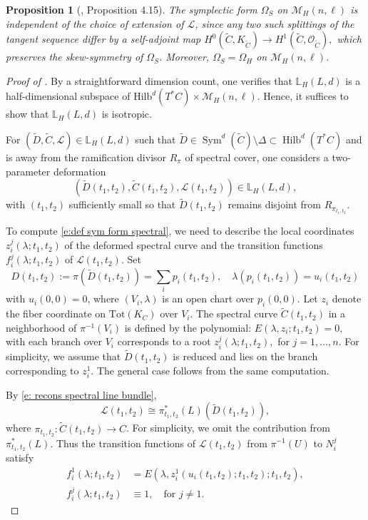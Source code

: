 \documentclass[twoside, 11pt]{article}
\numberwithin{equation}{section}
\theoremstyle{theorem}
\numberwithin{theorem}{section}
\newtheorem{proposition}[proposition]{Proposition}
\theoremstyle{definition}
\begin{document}
\begin{proposition}[\cite{Hur96}, Proposition 4.15]
The symplectic form $\Omega_S$ on $\mathcal{M}_{H}(n, \ell)$ is independent of the choice of extension of $\mathcal{L}$, since any two such splittings of the tangent sequence differ by a self-adjoint map
$
H^0(\widetilde{C}, K_{\widetilde{C}}) \longrightarrow H^1(\widetilde{C}, \mathcal{O}_{\widetilde{C}}),
$
which preserves the skew-symmetry of $\Omega_S$. Moreover, $\Omega_S = \Omega_H$ on $\mathcal{M}_{H}(n, \ell)$.
\end{proposition}

\begin{proof}[Proof of ]
By a straightforward dimension count, one verifies that
$\mathbb{L}_H(L,d)$ is a half-dimensional subspace of 
$\mathrm{Hilb}^d(T^*C)\times \mathcal{M}_{H}(n, \ell)$.
Hence, it suffices to show that $\mathbb{L}_H(L,d)$ is isotropic.


For $(\widetilde{D}, \widetilde{C}, \mathcal{L}) \in \mathbb{L}_H(L,d)$ such that $\widetilde{D} \in \operatorname{Sym}^d(\widetilde{C})\setminus \Delta \subset \operatorname{Hilb}^d(T^\ast C)$ and is away from the ramification divisor $R_\pi$ of spectral cover, one considers a two-parameter deformation
\[
(\widetilde{D}(t_1, t_2), \widetilde{C}(t_1, t_2), \mathcal{L}(t_1, t_2)) \in \mathbb{L}_H(L, d),
\]
with $(t_1, t_2)$ sufficiently small so that $\widetilde{D}(t_1, t_2)$ remains disjoint from $R_{\pi_{t_1,t_2}}$.

To compute \eqref{e:def sym form spectral}, we need to describe the local coordinates $z_i^j(\lambda; t_1, t_2)$ of the deformed spectral curve and the transition functions $f_i^j(\lambda; t_1, t_2)$ of $\mathcal{L}(t_1, t_2)$. Set
\[
D(t_1, t_2) := \pi\left(\widetilde{D}(t_1, t_2)\right) = \sum_i p_i(t_1, t_2),
\quad \lambda(p_i(t_1, t_2)) =u_i(t_1, t_2)
\]
with $u_i(0,0) = 0$, where $(V_i,\lambda)$ is an open chart over $p_i(0,0)$. Let $z_i$ denote the fiber coordinate on $\mathrm{Tot}(K_C)$ over $V_i$. The spectral curve $\widetilde{C}(t_1, t_2)$ in a neighborhood of $\pi^{-1}(V_i)$ is defined by the polynomial:
\(
    E(\lambda, z_i; t_1, t_2) = 0,
\)
with each branch over $V_i$ corresponds to a root
\(
z_i^j(\lambda; t_1, t_2), 
\)
for $j = 1, \dots, n$.
For simplicity, we assume that $\widetilde{D}(t_1,t_2)$ is reduced and lies on the branch corresponding to $z_i^1$. The general case follows from the same computation.

By \eqref{e: recons spectral line bundle}, 
\[
\mathcal{L}(t_1, t_2) \cong \pi_{t_1,t_2}^*(L)(\widetilde{D}(t_1,t_2)),
\]
where $\pi_{t_1,t_2}:  \widetilde{C}(t_1, t_2) \to C$. 
For simplicity, we omit the contribution from $\pi_{t_1,t_2}^*(L)$. Thus the transition functions of $\mathcal{L}(t_1, t_2)$ from $\pi^{-1}(U)$ to $N_i^j$ satisfy
\begin{align*}
f_i^1(\lambda; t_1, t_2) &= E(\lambda, z_i^1(u_i(t_1,t_2); t_1, t_2); t_1, t_2), \\
f_i^j(\lambda; t_1, t_2) &\equiv 1, \quad \text{for } j \neq 1.
\end{align*}


\end{proof}
\end{document}
